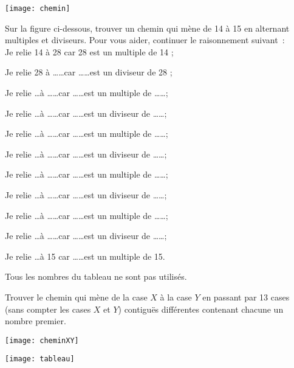\begin{exercice}
\begin{center} \texttt{[image: chemin]} \end{center}

Sur la figure ci-dessous, trouver un chemin qui mène de 14 à 15 en alternant multiples et diviseurs. Pour vous aider, continuer le raisonnement suivant : \\[1em]
Je relie 14 à 28 car 28 est un multiple de 14 ;

Je relie 28 à \ldots \ldots car \ldots \ldots est un diviseur de 28 ;

Je relie \ldots à \ldots \ldots car \ldots \ldots est un multiple de \ldots \ldots ;

Je relie \ldots à \ldots \ldots car \ldots \ldots est un diviseur de \ldots \ldots ;

Je relie \ldots à \ldots \ldots car \ldots \ldots est un multiple de \ldots \ldots ;

Je relie \ldots à \ldots \ldots car \ldots \ldots est un diviseur de \ldots \ldots ;

Je relie \ldots à \ldots \ldots car \ldots \ldots est un multiple de \ldots \ldots ;

Je relie \ldots à \ldots \ldots car \ldots \ldots est un diviseur de \ldots \ldots ;

Je relie \ldots à \ldots \ldots car \ldots \ldots est un multiple de \ldots \ldots ;

Je relie \ldots à \ldots \ldots car \ldots \ldots est un diviseur de \ldots \ldots ;

Je relie \ldots à 15 car \ldots \ldots est un multiple de 15.

Tous les nombres du tableau ne sont pas utilisés.

\end{exercice}


\begin{exercice}
Trouver le chemin qui mène de la case $X$ à la case $Y$ en passant par 13 cases (sans compter les cases $X$ et $Y$) contiguës différentes contenant chacune un nombre premier.

\begin{center} \texttt{[image: cheminXY]} \end{center}

\begin{center} \texttt{[image: tableau]} \end{center}
\end{exercice}
